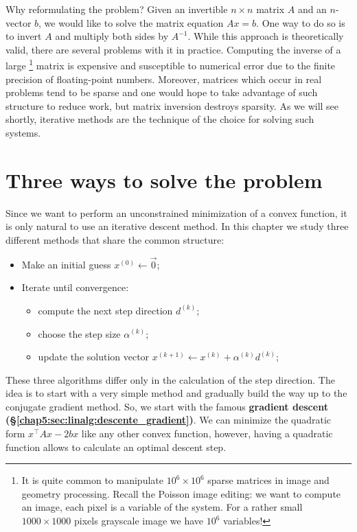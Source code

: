 \documentclass[notitlepage,oneside]{book}
\begin{document}
Why reformulating the problem?
Given an invertible $n \times n$ matrix $A$ and an $n$-vector $b$, we would like to solve the matrix equation $Ax = b$.
One way to do so is to invert $A$ and multiply both sides by $A^{-1}$.
While this approach is theoretically valid, there are several problems with it in practice. Computing the inverse of a large
\footnote{It is quite common to manipulate $10^6\times 10^6$ sparse matrices in image and geometry processing.
Recall the Poisson image editing: we want to compute an image, each pixel is a variable of the system. For a rather small $1000\times 1000$ pixels grayscale image we have $10^6$ variables!}
matrix is expensive and susceptible to numerical error due to the finite precision of floating-point numbers.
Moreover, matrices which occur in real problems tend to be sparse and one would hope to take advantage of such structure to reduce
work, but matrix inversion destroys sparsity.
As we will see shortly, iterative methods are the technique of the choice for solving such systems.



\section{Three ways to solve the problem}
\label{chap5:sec:linalg:formulations_pb}

Since we want to perform an unconstrained minimization of a convex function, it is only natural to use an iterative descent method.
In this chapter we study three different methods that share the common structure:
\begin{framed}
\begin{itemize}
\item Make an initial guess $x^{(0)} \leftarrow \vec{0} $;
\item Iterate until convergence:
\begin{itemize}
   \item compute the next step direction $d^{(k)}$;
   \item choose the step size $\alpha^{(k)}$;
   \item update the solution vector $x^{(k+1)} \leftarrow  x^{(k)}+\alpha^{(k)} d^{(k)}$;
\end{itemize}
\end{itemize}
\end{framed}

These three algorithms differ only in the calculation of the step direction. The idea is to start with a very simple method and gradually build the way up to the conjugate gradient method.
So, we start with the famous \textbf{gradient descent (\S\ref{chap5:sec:linalg:descente_gradient})}.
We can minimize the quadratic form $x^\top Ax-2bx$ like any other convex function, however, having a quadratic function allows to calculate an optimal descent step.
\end{document}
